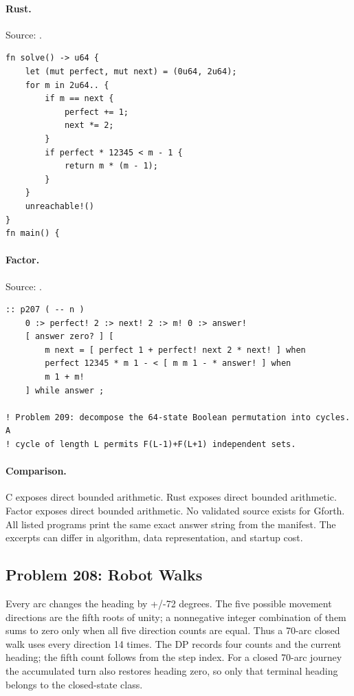 \paragraph{Rust.} Source: .
\begin{lstlisting}
fn solve() -> u64 {
    let (mut perfect, mut next) = (0u64, 2u64);
    for m in 2u64.. {
        if m == next {
            perfect += 1;
            next *= 2;
        }
        if perfect * 12345 < m - 1 {
            return m * (m - 1);
        }
    }
    unreachable!()
}
fn main() {
\end{lstlisting}

\paragraph{Factor.} Source: .
\begin{lstlisting}
:: p207 ( -- n )
    0 :> perfect! 2 :> next! 2 :> m! 0 :> answer!
    [ answer zero? ] [
        m next = [ perfect 1 + perfect! next 2 * next! ] when
        perfect 12345 * m 1 - < [ m m 1 - * answer! ] when
        m 1 + m!
    ] while answer ;

! Problem 209: decompose the 64-state Boolean permutation into cycles.  A
! cycle of length L permits F(L-1)+F(L+1) independent sets.
\end{lstlisting}

\paragraph{Comparison.}
C exposes direct bounded arithmetic. Rust exposes direct bounded arithmetic. Factor exposes direct bounded arithmetic.
No validated source exists for Gforth.
All listed programs print the same exact answer string from the manifest. The excerpts can differ in algorithm, data representation, and startup cost.

\subsection{Problem 208: Robot Walks}
\label{walkthrough:p208}
Every arc changes the heading by +/-72 degrees. The five possible movement directions are the fifth roots of unity; a nonnegative integer combination of them sums to zero only when all five direction counts are equal. Thus a 70-arc closed walk uses every direction 14 times. The DP records four counts and the current heading; the fifth count follows from the step index. For a closed 70-arc journey the accumulated turn also restores heading zero, so only that terminal heading belongs to the closed-state class.

